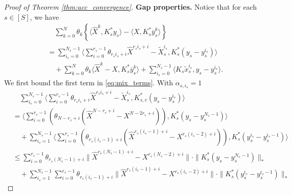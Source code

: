 \documentclass[10pt,a4paper]{amsart}
\begin{document}
\begin{proof}[Proof of Theorem \ref{thm:acc_convergence}]
\textbf{Gap properties.} Notice that for each $s\in [S]$, we have
\begin{align}\label{eq:mix_terms2}
&\quad \sum_{k=0}^{N}\theta_k\left\{\langle \widehat{X}^{k},K^*_{s}y_s\rangle - \langle X,K^*_{s}\overline{y}_s^{k}\rangle\right\}\nonumber\\
    &= \sum_{i_s=0}^{N_s-1}\langle\sum_{i=0}^{r_s-1} \theta_{r_si_s+i}\widehat{X}^{r_si_s+i}-\widetilde{X}_{s}^{i_s},K^*_{s}(y_s-y_s^{i_s})\rangle  \nonumber\\
    &\quad +\sum_{k=0}^N \theta_k \langle \widehat{X}^{k}-X,K^*_{s}\overline{y}_s^{k}\rangle +\sum_{i_s=0}^{N_s-1} \langle K_{s}\widetilde{x}_{s}^{i_s}, y_s- y_s^{i_s}\rangle .
\end{align}
We first bound the first term in \eqref{eq:mix_terms}. With $\alpha_{s,i_s} = 1$ 
\begin{align*}
   &\quad \sum_{i_s=0}^{N_s-1}\langle\sum_{i=0}^{r_s-1} \theta_{r_si_s+i}\widehat{X}^{r_si_s+i}-\widetilde{X}_{s}^{i_s},K^*_{s,v}(y_s-y_s^{i_s})\rangle \\
   &= \langle \sum_{i=0}^{r_s-1}(\theta_{N-r_s+i}(\widehat{X}^{N-r_s+i}-X^{N-2r_s+i})) ,K^*_{s}(y_s-y_s^{N_s-1})\rangle\\
   &\quad +  \sum_{i_s=1}^{N_s-1}\langle \sum_{i=0}^{r_s-1} (\theta_{r_s(i_s-1)+i}(\widehat{X}^{r_s(i_s-1)+i}-X^{r_s(i_s-2)+i})),K^*_{s}(y_s^{i_s}-y_s^{i_s-1})\rangle\\
   &\leq \sum_{i=0}^{r_s-1} \theta_{r_s(N_s-1)+i}\|\widehat{X}^{r_s(N_s-1)+i}-X^{r_s(N_s-2)+i}\|\cdot \| K^*_{s}(y_s-y_s^{N_s-1})\|_{*} \\
   &\quad +  \sum_{i_s=1}^{N_s-1}\sum_{i=0}^{r_s-1}   \theta_{r_s(i_s-1)+i}\|\widehat{X}^{r_s(i_s-1)+i}-X^{r_s(i_s-2)+i}\|\cdot \|K^*_{s}(y_s^{i_s}-y_s^{i_s-1})\|_{*}
\end{align*}




\end{proof}
\end{document}
